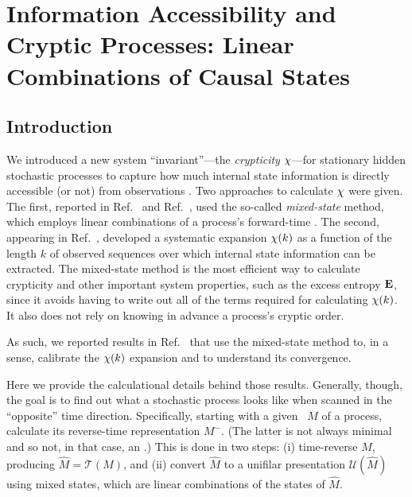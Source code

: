 \ifx\master\undefined\fi


\chapter{Information Accessibility and Cryptic Processes: Linear Combinations of Causal States}
\label{ch:IACPLOCS}

\section{Introduction}

We introduced a new system ``invariant''---the \emph{crypticity} $\chi$---for
stationary hidden stochastic processes to capture how much internal state
information is directly accessible (or not) from observations
\cite{Crut08a,Crut08b,Maho09a}. Two approaches to calculate $\chi$ were given.
The first, reported in Ref.~\cite{Crut08a} and Ref.~\cite{Crut08b}, used the
so-called \emph{mixed-state} method, which employs linear combinations of a
process's forward-time \eM. The second, appearing in Ref.~\cite{Maho09a},
developed a systematic expansion $\chi(k)$ as a function of the length $k$ of
observed sequences over which internal state information can be extracted.
The mixed-state method is the most efficient way to calculate crypticity and
other important system properties, such as the excess entropy ${\bf E}$, since it
avoids having to write out all of the terms required for calculating $\chi(k)$.
It also does not rely on knowing in advance a process's cryptic order.

As such, we reported results in Ref.~\cite{Maho09a} that use the mixed-state
method to, in a sense, calibrate the $\chi(k)$ expansion and to understand its
convergence.

Here we provide the calculational details behind those results. Generally,
though, the goal is to
find out what a stochastic process looks like when scanned in the ``opposite''
time direction. Specifically, starting with a given \eM\ $M$ of a process,
calculate its reverse-time representation $M^-$. (The latter is not always
minimal and so not, in that case, an \eM.) This is done in two steps: (i)
time-reverse $M$, producing $\widehat{M} = \mathcal{T}(M)$, and (ii) convert
$\widehat{M}$ to a unifilar presentation $\mathcal{U}(\widehat{M})$ using mixed
states, which are linear combinations of the states of $\widehat{M}$.


